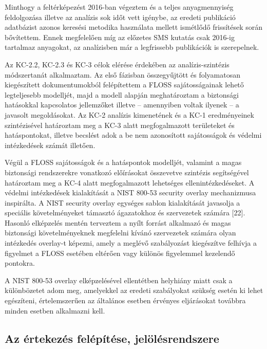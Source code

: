 \documentclass[12pt,magyar,a4paper,oneside]{scrreprt}
\begin{document}
Minthogy a feltérképezést 2016-ban végeztem és a teljes anyagmennyiség
feldolgozása illetve az analízis sok időt vett igénybe, az eredeti
publikáció adatbázist azonos keresési metodika használata mellett
ismétlődő frissítések során bővítettem. Ennek megfelelően míg az
előzetes SMS kutatás csak 2016-ig tartalmaz anyagokat, az analízisben
már a legfrissebb publikációk is szerepelnek.

Az KC-2.2, KC-2.3 és KC-3 célok elérése érdekében az analízis-szintézis
módszertanát alkalmaztam. Az első fázisban összegyűjtött és folyamatosan
kiegészített dokumentumokból felépítettem a FLOSS sajátosságainak lehető
legteljesebb modelljét, majd a modell alapján meghatároztam a biztonsági
hatásokkal kapcsolatos jellemzőket illetve -- amennyiben voltak ilyenek
-- a javasolt megoldásokat. Az KC-2 analízis kimenetének és a KC-1
eredményeinek szintézisével határoztam meg a KC-3 alatt megfogalmazott
területeket és hatáspontokat, illetve becslést adok a be nem azonosított
sajátosságok és védelmi intézkedések számát illetően.

Végül a FLOSS sajátosságok és a hatáspontok modelljét, valamint a magas
biztonsági rendszerekre vonatkozó előírásokat összevetve szintézis
segítségével határoztam meg a KC-4 alatt megfogalmazott lehetséges
ellenintézkedéseket. A védelmi intézkedések kialakítását a NIST 800-53
security overlay mechanizmusa inspirálta. A NIST security overlay
egységes sablon kialakítását javasolja a speciális követelményeket
támasztó ágazatokhoz és szervezetek számára {[}22{]}. Hasonló elképzelés
mentén terveztem a nyílt forrást alkalmazó és magas biztonsági
követelményeknek megfelelni kívánó szervezetek számára olyan intézkedés
overlay-t képezni, amely a meglévő szabályozást kiegészítve felhívja a
figyelmet a FLOSS esetében eltérően vagy különös figyelemmel kezelendő
pontokra.

A NIST 800-53 overlay elképzelésével ellentétben helyhiány miatt csak a
különbözetet adom meg, amelyekkel az eredeti szabályokat szükség esetén
ki lehet egészíteni, értelemszerűen az általános esetben érvényes
eljárásokat továbbra minden esetben alkalmazni kell.

\hypertarget{az-uxe9rtekezuxe9s-feluxe9puxedtuxe9se-jeluxf6luxe9srendszere}{%
\subsection{Az értekezés felépítése,
jelölésrendszere}\label{az-uxe9rtekezuxe9s-feluxe9puxedtuxe9se-jeluxf6luxe9srendszere}}
\end{document}
